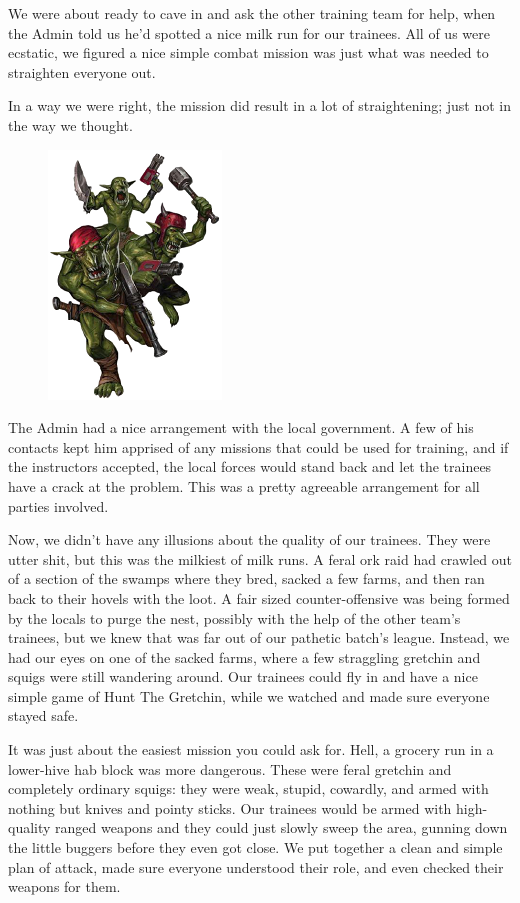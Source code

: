 We were about ready to cave in and ask the other training team for help, when the Admin told us he’d spotted a nice milk run for our trainees. 
All of us were ecstatic, we figured a nice simple combat mission was just what was needed to straighten everyone out.

In a way we were right, the mission did result in a lot of straightening; 
just not in the way we thought.

\begin{figure}
	\begin{center}
		\includegraphics[width=\figwidth]{pics/8/17.png}
	\end{center}
\end{figure}
The Admin had a nice arrangement with the local government. 
A few of his contacts kept him apprised of any missions that could be used for training, and if the instructors accepted, the local forces would stand back and let the trainees have a crack at the problem. 
This was a pretty agreeable arrangement for all parties involved.

Now, we didn’t have any illusions about the quality of our trainees. 
They were utter shit, but this was the milkiest of milk runs. 
A feral ork raid had crawled out of a section of the swamps where they bred, sacked a few farms, and then ran back to their hovels with the loot. 
A fair sized counter-offensive was being formed by the locals to purge the nest, possibly with the help of the other team’s trainees, but we knew that was far out of our pathetic batch’s league. 
Instead, we had our eyes on one of the sacked farms, where a few straggling gretchin and squigs were still wandering around. 
Our trainees could fly in and have a nice simple game of Hunt The Gretchin, while we watched and made sure everyone stayed safe.

It was just about the easiest mission you could ask for. 
Hell, a grocery run in a lower-hive hab block was more dangerous. 
These were feral gretchin and completely ordinary squigs: 
they were weak, stupid, cowardly, and armed with nothing but knives and pointy sticks. 
Our trainees would be armed with high-quality ranged weapons and they could just slowly sweep the area, gunning down the little buggers before they even got close. 
We put together a clean and simple plan of attack, made sure everyone understood their role, and even checked their weapons for them. 


